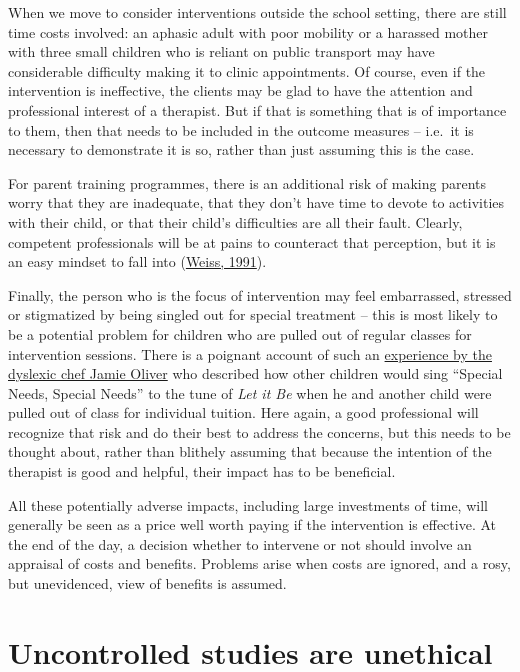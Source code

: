\documentclass{krantz}
\begin{document}
When we move to consider interventions outside the school setting, there are still time costs involved: an aphasic adult with poor mobility or a harassed mother with three small children who is reliant on public transport may have considerable difficulty making it to clinic appointments. Of course, even if the intervention is ineffective, the clients may be glad to have the attention and professional interest of a therapist. But if that is something that is of importance to them, then that needs to be included in the outcome measures -- i.e.~it is necessary to demonstrate it is so, rather than just assuming this is the case.

For parent training programmes, there is an additional risk of making parents worry that they are inadequate, that they don't have time to devote to activities with their child, or that their child's difficulties are all their fault. Clearly, competent professionals will be at pains to counteract that perception, but it is an easy mindset to fall into (\protect\hyperlink{ref-weiss1991}{Weiss, 1991}).

Finally, the person who is the focus of intervention may feel embarrassed, stressed or stigmatized by being singled out for special treatment -- this is most likely to be a potential problem for children who are pulled out of regular classes for intervention sessions. There is a poignant account of such an \href{https://www.standard.co.uk/news/celebritynews/school-labelled-me-as-special-needs-says-chef-jamie-oliver-who-suffers-from-dyslexia-9033901.html}{experience by the dyslexic chef Jamie Oliver} who described how other children would sing ``Special Needs, Special Needs'' to the tune of \emph{Let it Be} when he and another child were pulled out of class for individual tuition. Here again, a good professional will recognize that risk and do their best to address the concerns, but this needs to be thought about, rather than blithely assuming that because the intention of the therapist is good and helpful, their impact has to be beneficial.

All these potentially adverse impacts, including large investments of time, will generally be seen as a price well worth paying if the intervention is effective. At the end of the day, a decision whether to intervene or not should involve an appraisal of costs and benefits. Problems arise when costs are ignored, and a rosy, but unevidenced, view of benefits is assumed.

\hypertarget{uncontrolled-studies-are-unethical}{%
\section{Uncontrolled studies are unethical}\label{uncontrolled-studies-are-unethical}}
\end{document}
